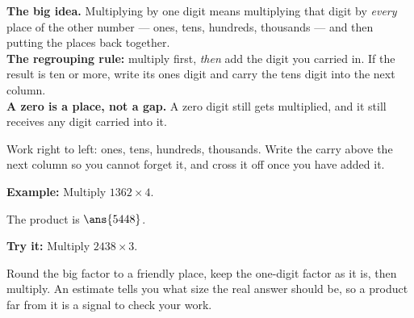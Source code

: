 \documentclass[12pt]{article}
\begin{document}

\begin{formulabox}
\textbf{The big idea.} Multiplying by one digit means multiplying that digit
by \emph{every} place of the other number --- ones, tens, hundreds, thousands
--- and then putting the places back together.\\[3pt]
\textbf{The regrouping rule:} multiply first, \emph{then} add the digit you
carried in. If the result is ten or more, write its ones digit and carry the
tens digit into the next column.\\[3pt]
\textbf{A zero is a place, not a gap.} A zero digit still gets multiplied, and
it still receives any digit carried into it.
\end{formulabox}


\begin{formulabox}
Work right to left: ones, tens, hundreds, thousands. Write the carry above the
next column so you cannot forget it, and cross it off once you have added it.
\end{formulabox}

\begin{examplebox}
\textbf{Example:} Multiply $1362 \times 4$.

The product is $\ans{5448}$.
\end{examplebox}

\begin{tryitbox}
\textbf{Try it:} Multiply $2438 \times 3$.\\[2pt]
\end{tryitbox}


\begin{formulabox}
Round the big factor to a friendly place, keep the one-digit factor as it is,
then multiply. An estimate tells you what size the real answer should be, so a
product far from it is a signal to check your work.
\end{formulabox}
\end{document}
